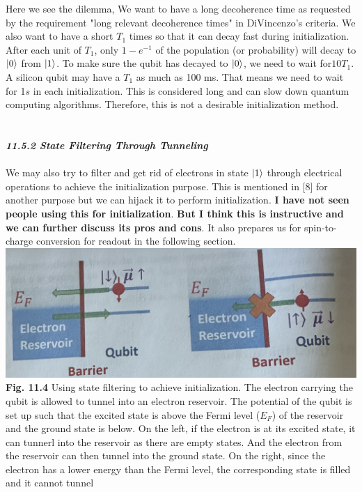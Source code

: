 \documentclass{article}
\newcommand{\bfit}[1]{\textit{\textbf{#1}}}
\begin{document}
Here we see the dilemma, We want to have a long decoherence time as requested by the requirement
"long relevant decoherence times" in DiVincenzo's criteria. We also want to have a short $T_1$ times
so that it can decay fast during initialization. After each unit of $T_1$, only $1-e^{-1}$ of the population
(or probability) will decay to $\ket{0}$ from $\ket{1}$. To make sure the qubit has decayed to $\ket{0}$,
we need to wait for$10T_1$. A silicon qubit may have a $T_1$ as much as 100 ms. That means we need to wait for
1$s$ in each initialization. This is considered long and can slow down quantum computing algorithms. Therefore,
this is not a desirable initialization method.\\\\\\
\bfit{\large 11.5.2 State Filtering Through Tunneling}\\\\
We may also try to filter and get rid of electrons in state $\ket{1}$ through electrical
operations to achieve the initialization purpose. This is mentioned in [8] for another purpose
but we can hijack it to perform initialization. \textbf{I have not seen people using this for initialization}. \textbf{But I think this is instructive and we can further discuss its pros and cons}.
It also prepares us for spin-to-charge conversion for readout in the following section.\\

\includegraphics[scale=0.45]{Fig.11.4.jpeg}\\
\textbf{Fig. 11.4} Using state filtering to achieve initialization. The electron carrying the qubit is allowed
to tunnel into an electron reservoir. The potential of the qubit is set up such that the excited state is above
the Fermi level ($E_F$) of the reservoir and the ground state is below. On the left,
if the electron is at its excited state, it can tunnerl into the reservoir as there are empty states.
And the electron from the reservoir can then tunnel into the ground state. On the right, since the electron has
a lower energy than the Fermi level, the corresponding state is filled and it cannot tunnel\\
\end{document}
